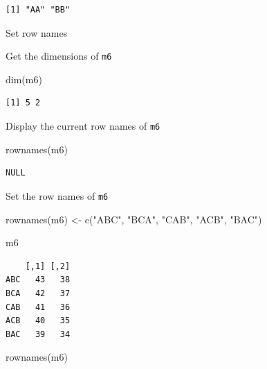 \documentclass[
  letterpaper,
  DIV=11,
  numbers=noendperiod]{scrreprt}
\newenvironment{Shaded}{\begin{snugshade}}{\end{snugshade}}
\newcommand{\FunctionTok}[1]{\textcolor[rgb]{0.28,0.35,0.67}{#1}}
\newcommand{\NormalTok}[1]{\textcolor[rgb]{0.00,0.23,0.31}{#1}}
\newcommand{\OtherTok}[1]{\textcolor[rgb]{0.00,0.23,0.31}{#1}}
\newcommand{\StringTok}[1]{\textcolor[rgb]{0.13,0.47,0.30}{#1}}
\begin{document}
\begin{verbatim}
[1] "AA" "BB"
\end{verbatim}

Set row names

Get the dimensions of \texttt{m6}

\begin{Shaded}
\begin{Highlighting}[]
\FunctionTok{dim}\NormalTok{(m6)}
\end{Highlighting}
\end{Shaded}

\begin{verbatim}
[1] 5 2
\end{verbatim}

Display the current row names of \texttt{m6}

\begin{Shaded}
\begin{Highlighting}[]
\FunctionTok{rownames}\NormalTok{(m6)}
\end{Highlighting}
\end{Shaded}

\begin{verbatim}
NULL
\end{verbatim}

Set the row names of \texttt{m6}

\begin{Shaded}
\begin{Highlighting}[]
\FunctionTok{rownames}\NormalTok{(m6) }\OtherTok{\textless{}{-}} \FunctionTok{c}\NormalTok{(}\StringTok{"ABC"}\NormalTok{, }\StringTok{"BCA"}\NormalTok{, }\StringTok{"CAB"}\NormalTok{, }\StringTok{"ACB"}\NormalTok{, }\StringTok{"BAC"}\NormalTok{)}
\end{Highlighting}
\end{Shaded}

\begin{Shaded}
\begin{Highlighting}[]
\NormalTok{m6}
\end{Highlighting}
\end{Shaded}

\begin{verbatim}
    [,1] [,2]
ABC   43   38
BCA   42   37
CAB   41   36
ACB   40   35
BAC   39   34
\end{verbatim}

\begin{Shaded}
\begin{Highlighting}[]
\FunctionTok{rownames}\NormalTok{(m6)}
\end{Highlighting}
\end{Shaded}
\end{document}
